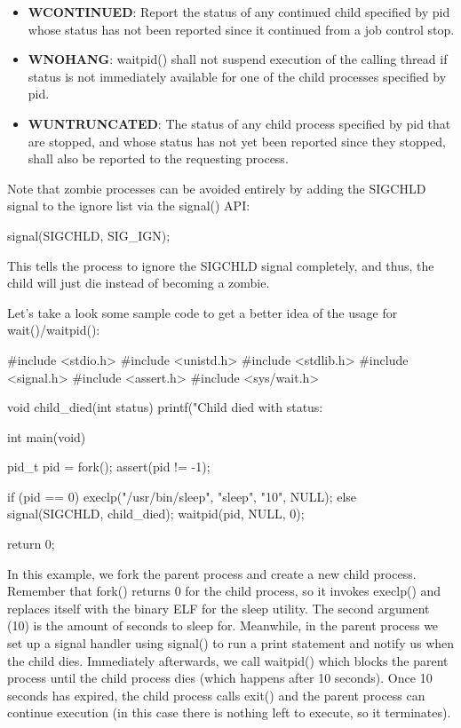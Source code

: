 \documentclass{article}
\begin{document}
\begin{itemize}

\item{%
    \textbf{WCONTINUED}: Report the status of any continued child specified by pid whose status has not been
    reported since it continued from a job control stop.
}

\item{%
    \textbf{WNOHANG}: waitpid() shall not suspend execution of the calling thread if status is not immediately
    available for one of the child processes specified by pid.
}

\item{%
    \textbf{WUNTRUNCATED}: The status of any child process specified by pid that are stopped, and whose status
    has not yet been reported since they stopped, shall also be reported to the requesting process.
}

\end{itemize}

Note that zombie processes can be avoided entirely by adding the SIGCHLD signal to the ignore list via the
signal() API:

\begin{clst}

signal(SIGCHLD, SIG_IGN);

\end{clst}

This tells the process to ignore the SIGCHLD signal completely, and thus, the child will just die instead of
becoming a zombie.

Let's take a look some sample code to get a better idea of the usage for wait()/waitpid():

\begin{clst}

#include <stdio.h>
#include <unistd.h>
#include <stdlib.h>
#include <signal.h>
#include <assert.h>
#include <sys/wait.h>

void child_died(int status) {
    printf("Child died with status: %
}

int main(void) {
    pid_t pid = fork();
    assert(pid != -1);

    if (pid == 0) {
        execlp("/usr/bin/sleep", "sleep", "10", NULL);
    } else {
        signal(SIGCHLD, child_died);
        waitpid(pid, NULL, 0);
    }

    return 0;
}

\end{clst}

In this example, we fork the parent process and create a new child process. Remember that fork() returns 0 for
the child process, so it invokes execlp() and replaces itself with the binary ELF for the sleep utility. The
second argument (10) is the amount of seconds to sleep for. Meanwhile, in the parent process we set up a
signal handler using signal() to run a print statement and notify us when the child dies. Immediately
afterwards, we call waitpid() which blocks the parent process until the child process dies (which happens
after 10 seconds). Once 10 seconds has expired, the child process calls exit() and the parent process can
continue execution (in this case there is nothing left to execute, so it terminates).
\end{document}
